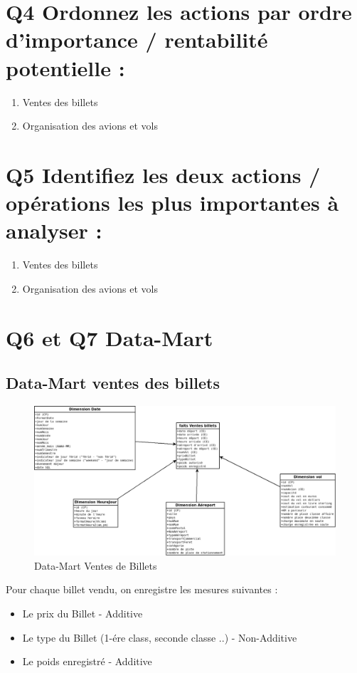 \documentclass[oneside,13pt,a4paper]{article}
\begin{document}
\section{Q4 Ordonnez les actions par ordre d’importance / rentabilité potentielle : }
\begin{enumerate}
  \item Ventes des billets
  \item Organisation des avions et vols
\end{enumerate}

\section{Q5 Identifiez les deux actions / opérations les plus importantes à analyser : }

\begin{enumerate}
  \item Ventes des billets
  \item Organisation des avions et vols
\end{enumerate}

\section{Q6 et Q7 Data-Mart}

\subsection{Data-Mart ventes des billets}

\begin{figure}[h]
  \centering
  \includegraphics[width=1\textwidth]{img/VenteBillet.png}
  \caption{Data-Mart Ventes de Billets}
\end{figure}

Pour chaque billet vendu, on enregistre les mesures suivantes :
\begin{itemize}
  \item Le prix du Billet - Additive
  \item Le type du Billet (1-ére class, seconde classe ..) - Non-Additive
  \item Le poids enregistré - Additive
\end{itemize}
\end{document}

